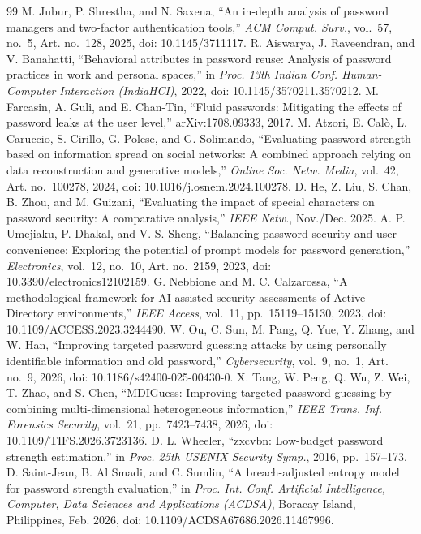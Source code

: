\documentclass[conference]{IEEEtran}
\begin{document}
\begin{thebibliography}{99}
 M. Jubur, P. Shrestha, and N. Saxena, ``An in-depth analysis of password managers and two-factor authentication tools,'' \emph{ACM Comput. Surv.}, vol.~57, no.~5, Art. no.~128, 2025, doi: 10.1145/3711117.
 R. Aiswarya, J. Raveendran, and V. Banahatti, ``Behavioral attributes in password reuse: Analysis of password practices in work and personal spaces,'' in \emph{Proc. 13th Indian Conf. Human-Computer Interaction (IndiaHCI)}, 2022, doi: 10.1145/3570211.3570212.
 M. Farcasin, A. Guli, and E. Chan-Tin, ``Fluid passwords: Mitigating the effects of password leaks at the user level,'' arXiv:1708.09333, 2017.
 M. Atzori, E. Cal\`o, L. Caruccio, S. Cirillo, G. Polese, and G. Solimando, ``Evaluating password strength based on information spread on social networks: A combined approach relying on data reconstruction and generative models,'' \emph{Online Soc. Netw. Media}, vol.~42, Art. no.~100278, 2024, doi: 10.1016/j.osnem.2024.100278.
 D. He, Z. Liu, S. Chan, B. Zhou, and M. Guizani, ``Evaluating the impact of special characters on password security: A comparative analysis,'' \emph{IEEE Netw.}, Nov./Dec. 2025.
 A. P. Umejiaku, P. Dhakal, and V. S. Sheng, ``Balancing password security and user convenience: Exploring the potential of prompt models for password generation,'' \emph{Electronics}, vol.~12, no.~10, Art. no.~2159, 2023, doi: 10.3390/electronics12102159.
 G. Nebbione and M. C. Calzarossa, ``A methodological framework for AI-assisted security assessments of Active Directory environments,'' \emph{IEEE Access}, vol.~11, pp.~15119--15130, 2023, doi: 10.1109/ACCESS.2023.3244490.
 W. Ou, C. Sun, M. Pang, Q. Yue, Y. Zhang, and W. Han, ``Improving targeted password guessing attacks by using personally identifiable information and old password,'' \emph{Cybersecurity}, vol.~9, no.~1, Art. no.~9, 2026, doi: 10.1186/s42400-025-00430-0.
 X. Tang, W. Peng, Q. Wu, Z. Wei, T. Zhao, and S. Chen, ``MDIGuess: Improving targeted password guessing by combining multi-dimensional heterogeneous information,'' \emph{IEEE Trans. Inf. Forensics Security}, vol.~21, pp.~7423--7438, 2026, doi: 10.1109/TIFS.2026.3723136.
 D. L. Wheeler, ``zxcvbn: Low-budget password strength estimation,'' in \emph{Proc. 25th USENIX Security Symp.}, 2016, pp.~157--173.
 D. Saint-Jean, B. Al Smadi, and C. Sumlin, ``A breach-adjusted entropy model for password strength evaluation,'' in \emph{Proc. Int. Conf. Artificial Intelligence, Computer, Data Sciences and Applications (ACDSA)}, Boracay Island, Philippines, Feb. 2026, doi: 10.1109/ACDSA67686.2026.11467996.

\end{thebibliography}
\end{document}
